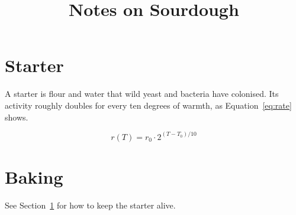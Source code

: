 \documentclass{article}
\title{Notes on Sourdough}
\begin{document}
\maketitle

\section{Starter}\label{sec:starter}
A starter is flour and water that wild yeast and bacteria have colonised. Its activity
roughly doubles for every ten degrees of warmth, as Equation~\ref{eq:rate} shows.

\begin{equation}\label{eq:rate}
  r(T) = r_0 \cdot 2^{(T - T_0)/10}
\end{equation}

\section{Baking}
See Section~\ref{sec:starter} for how to keep the starter alive. %
\end{document}
